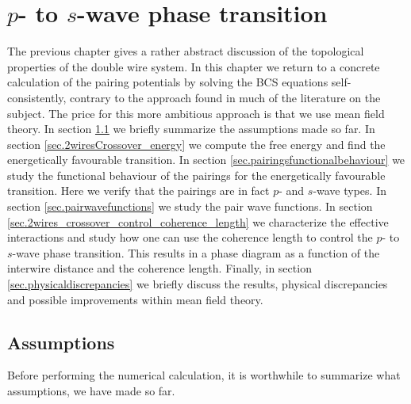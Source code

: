 \chapter{\texorpdfstring{$p$}{p}- to \texorpdfstring{$s$}{s}-wave phase transition} %

\label{Chapter6} 

The previous chapter gives a rather abstract discussion of the topological properties of the double wire system. In this chapter we return to a concrete calculation of the pairing potentials by solving the BCS equations self-consistently, contrary to the approach found in much of the literature on the subject. The price for this more ambitious approach is that we use mean field theory. In section \ref{sec.assumptions} we briefly summarize the assumptions made so far. In section \ref{sec.2wiresCrossover_energy} we compute the free energy and find the energetically favourable transition. In section \ref{sec.pairingsfunctionalbehaviour} we study the functional behaviour of the pairings for the energetically favourable transition. Here we verify that the pairings are in fact $p$- and $s$-wave types. In section \ref{sec.pairwavefunctions} we study the pair wave functions. In section \ref{sec.2wires_crossover_control_coherence_length} we characterize the effective interactions and study how one can use the coherence length to control the $p$- to $s$-wave phase transition. This results in a phase diagram as a function of the interwire distance and the coherence length. Finally, in section \ref{sec.physicaldiscrepancies} we briefly discuss the results, physical discrepancies and possible improvements within mean field theory.

\section{Assumptions} \label{sec.assumptions}
Before performing the numerical calculation, it is worthwhile to summarize what assumptions, we have made so far. 

